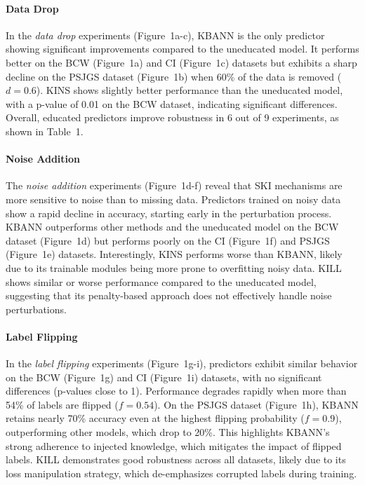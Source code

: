 \paragraph{Data Drop}
%
In the \emph{data drop} experiments (Figure~1a-c), \gls{KBANN} is the only predictor showing significant improvements compared to the uneducated model.
%
It performs better on the \gls{BCW} (Figure~1a) and \gls{CI} (Figure~1c) datasets but exhibits a sharp decline on the \gls{PSJGS} dataset (Figure~1b) when 60\% of the data is removed (\(d = 0.6\)).
%
\gls{KINS} shows slightly better performance than the uneducated model, with a p-value of 0.01 on the \gls{BCW} dataset, indicating significant differences.
%
Overall, educated predictors improve robustness in 6 out of 9 experiments, as shown in Table~1.
%
\paragraph{Noise Addition}
%
The \emph{noise addition} experiments (Figure~1d-f) reveal that \gls{SKI} mechanisms are more sensitive to noise than to missing data.
%
Predictors trained on noisy data show a rapid decline in accuracy, starting early in the perturbation process.
%
\gls{KBANN} outperforms other methods and the uneducated model on the \gls{BCW} dataset (Figure~1d) but performs poorly on the \gls{CI} (Figure~1f) and \gls{PSJGS} (Figure~1e) datasets.
%
Interestingly, \gls{KINS} performs worse than \gls{KBANN}, likely due to its trainable modules being more prone to overfitting noisy data.
%
\gls{KILL} shows similar or worse performance compared to the uneducated model, suggesting that its penalty-based approach does not effectively handle noise perturbations.
%
\paragraph{Label Flipping}
%
In the \emph{label flipping} experiments (Figure~1g-i), predictors exhibit similar behavior on the \gls{BCW} (Figure~1g) and \gls{CI} (Figure~1i) datasets, with no significant differences (p-values close to 1).
%
Performance degrades rapidly when more than 54\% of labels are flipped (\(f = 0.54\)).
%
On the \gls{PSJGS} dataset (Figure~1h), \gls{KBANN} retains nearly 70\% accuracy even at the highest flipping probability (\(f = 0.9\)), outperforming other models, which drop to 20\%.
%
This highlights \gls{KBANN}'s strong adherence to injected knowledge, which mitigates the impact of flipped labels.
%
\gls{KILL} demonstrates good robustness across all datasets, likely due to its loss manipulation strategy, which de-emphasizes corrupted labels during training.
%
